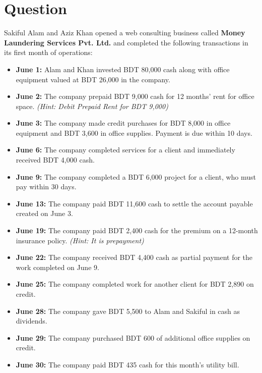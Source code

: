 \documentclass[12pt,a4paper]{book}
\begin{document}
\vspace{0.5cm} 

\vspace{0.5cm}
\section*{Question}
Sakiful Alam and Aziz Khan opened a web consulting business called \textbf{Money Laundering Services Pvt. Ltd.} and completed the following transactions in its first month of operations:

\begin{itemize}
    \item \textbf{June 1:} Alam and Khan invested BDT 80,000 cash along with office equipment valued at BDT 26,000 in the company.
    \item \textbf{June 2:} The company prepaid BDT 9,000 cash for 12 months' rent for office space. \textit{(Hint: Debit Prepaid Rent for BDT 9,000)}
    \item \textbf{June 3:} The company made credit purchases for BDT 8,000 in office equipment and BDT 3,600 in office supplies. Payment is due within 10 days.
    \item \textbf{June 6:} The company completed services for a client and immediately received BDT 4,000 cash.
    \item \textbf{June 9:} The company completed a BDT 6,000 project for a client, who must pay within 30 days.
    \item \textbf{June 13:} The company paid BDT 11,600 cash to settle the account payable created on June 3.
    \item \textbf{June 19:} The company paid BDT 2,400 cash for the premium on a 12-month insurance policy. \textit{(Hint: It is prepayment)}
    \item \textbf{June 22:} The company received BDT 4,400 cash as partial payment for the work completed on June 9.
    \item \textbf{June 25:} The company completed work for another client for BDT 2,890 on credit.
    \item \textbf{June 28:} The company gave BDT 5,500 to Alam and Sakiful in cash as dividends.
    \item \textbf{June 29:} The company purchased BDT 600 of additional office supplies on credit.
    \item \textbf{June 30:} The company paid BDT 435 cash for this month's utility bill.
\end{itemize}
\end{document}
